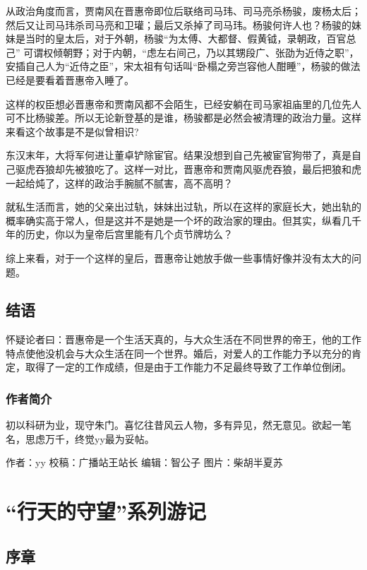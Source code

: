 \documentclass[]{book}
\begin{document}
从政治角度而言，贾南风在晋惠帝即位后联络司马玮、司马亮杀杨骏，废杨太后；然后又让司马玮杀司马亮和卫瓘；最后又杀掉了司马玮。杨骏何许人也？杨骏的妹妹是当时的皇太后，对于外朝，杨骏``为太傅、大都督、假黄钺，录朝政，百官总己''
可谓权倾朝野；对于内朝，``虑左右间己，乃以其甥段广、张劭为近侍之职''，安插自己人为``近侍之臣''，宋太祖有句话叫``卧榻之旁岂容他人酣睡''，杨骏的做法已经是要看着晋惠帝入睡了。

这样的权臣想必晋惠帝和贾南风都不会陌生，已经安躺在司马家祖庙里的几位先人可不比杨骏差。所以无论新登基的是谁，杨骏都是必然会被清理的政治力量。这样来看这个故事是不是似曾相识?

东汉末年，大将军何进让董卓铲除宦官。结果没想到自己先被宦官狗带了，真是自己驱虎吞狼却先被狼吃了。这样一对比，晋惠帝和贾南风驱虎吞狼，最后把狼和虎一起给炖了，这样的政治手腕腻不腻害，高不高明？

就私生活而言，她的父亲出过轨，妹妹出过轨，所以在这样的家庭长大，她出轨的概率确实高于常人，但是这并不是她是一个坏的政治家的理由。但其实，纵看几千年的历史，你以为皇帝后宫里能有几个贞节牌坊么？

综上来看，对于一个这样的皇后，晋惠帝让她放手做一些事情好像并没有太大的问题。

\subsection{结语}\label{-8}

怀疑论者曰：晋惠帝是一个生活天真的，与大众生活在不同世界的帝王，他的工作特点使他没机会与大众生活在同一个世界。婚后，对爱人的工作能力予以充分的肯定，取得了一定的工作成绩，但是由于工作能力不足最终导致了工作单位倒闭。

\subsubsection*{作者简介}

初以科研为业，现守朱门。喜忆往昔风云人物，多有异见，然无意见。欲起一笔名，思虑万千，终觉yy最为妥帖。

作者：yy 校稿：广播站王站长 编辑：智公子 图片：柴胡半夏苏

\section{\texorpdfstring{``行天的守望''系列游记}{行天的守望系列游记}}

\subsection{序章}
\end{document}
